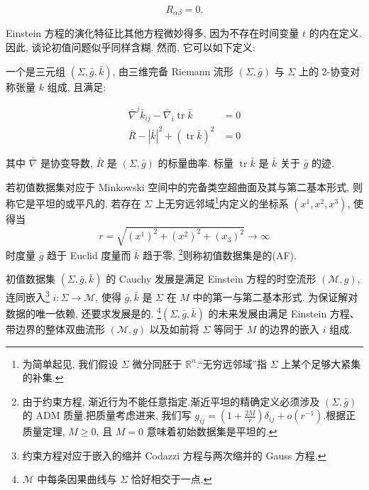 \[
R _ {\alpha \beta} = 0.
\]

Einstein 方程的演化特征比其他方程微妙得多, 因为不存在时间变量 $t$ 的内在定义. 因此, 谈论初值问题似乎同样含糊. 然而, 它可以如下定义:

\begin{definition}\label{def:cG-3.2}
一个是三元组 $(\Sigma, \bar{g}, \bar{k})$, 由三维完备 Riemann 流形 $(\Sigma, \bar{g})$ 与 $\Sigma$ 上的 2-协变对称张量 $k$ 组成, 且满足:

\[
\begin{aligned}
\bar {\nabla} ^ {j} \bar {k} _ {i j} - \bar {\nabla} _ {i} \operatorname{tr} \bar {k} &= 0 \\
\bar {R} - | \bar {k} | ^ {2} + (\operatorname{tr} \bar {k}) ^ {2} &= 0
\end{aligned}
\]

其中 $\bar{\nabla}$ 是协变导数, $\bar{R}$ 是 $(\Sigma, \bar{g})$ 的标量曲率. 标量 $\operatorname{tr} \bar{k}$ 是 $\bar{k}$ 关于 $\bar{g}$ 的迹. 
\end{definition}

\begin{definition}\label{def:cG-3.3}
若初值数据集对应于 Minkowski 空间中的完备类空超曲面及其与第二基本形式, 则称它是平坦的或平凡的. 若存在 $\Sigma$ 上无穷远邻域\footnote{为简单起见, 我们假设 $\Sigma$ 微分同胚于 $\mathbb{R}^n$.``无穷远邻域''指 $\Sigma$ 上某个足够大紧集的补集.}内定义的坐标系 $(x^{1},  x^{2},  x^{3})$, 使得当
\[
r = \sqrt {(x ^ {1}) ^ {2} + (x ^ {2}) ^ {2} + (x _ {3}) ^ {2}} \to \infty
\]
时度量 $\bar{g}$ 趋于 Euclid 度量而 $\bar{k}$ 趋于零, \footnote{由于约束方程, 渐近行为不能任意指定.渐近平坦的精确定义必须涉及 $(\Sigma, \bar{g})$ 的 ADM 质量.把质量考虑进来, 我们写 $g_{ij}=(1+\frac{2M}{r})\delta_{ij}+o(r^{-1})$.根据正质量定理, $M\ge 0$, 且 $M=0$ 意味着初始数据集是平坦的.}则称初值数据集是的(AF). 
\end{definition}

\begin{definition}\label{def:cG-3.4}
初值数据集 $(\Sigma, \bar{g}, \bar{k})$ 的 Cauchy 发展是满足 Einstein 方程的时空流形 $(\mathcal{M}, g)$, 连同嵌入\footnote{约束方程对应于嵌入的缩并 Codazzi 方程与两次缩并的 Gauss 方程.} $i:\Sigma\longrightarrow\mathcal{M}$, 使得 $\bar{g}, \bar{k}$ 是 $\Sigma$ 在 $M$ 中的第一与第二基本形式. 为保证解对数据的唯一依赖, 还要求发展是的. \footnote{$\mathcal{M}$ 中每条因果曲线与 $\Sigma$ 恰好相交于一点.}$(\Sigma, \bar{g}, \bar{k})$ 的未来发展由满足 Einstein 方程、带边界的整体双曲流形 $(\mathcal{M}, g)$ 以及如前将 $\Sigma$ 等同于 $M$ 的边界的嵌入 $i$ 组成. 
\end{definition}

